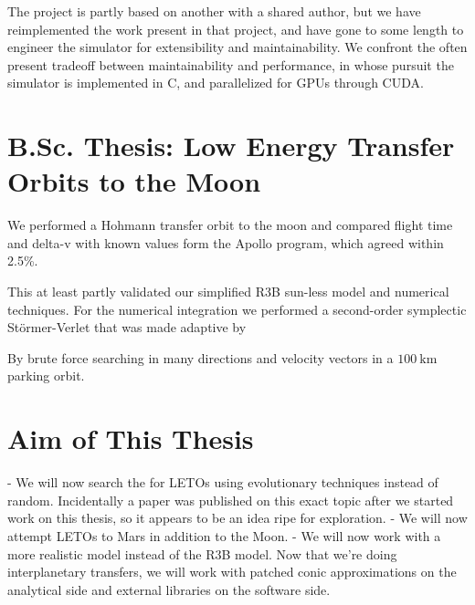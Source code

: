 The project is partly based on another with a shared author, but we have reimplemented the work present in that project, and have gone to some length to engineer the simulator for extensibility and maintainability. We confront the often present tradeoff between maintainability and performance, in whose pursuit the simulator is implemented in C, and parallelized for GPUs through CUDA. 

\section{B.Sc. Thesis: Low Energy Transfer Orbits to the Moon}


We performed a Hohmann transfer orbit to the moon and compared flight time and delta-v with known values form the Apollo program, which agreed within 2.5\%.


This at least partly validated our simplified R3B sun-less model and numerical techniques. For the numerical integration we performed a second-order symplectic Störmer-Verlet that was made adaptive by 


By brute force searching in many directions and velocity vectors in a \(\SI{100}{\km}\) parking orbit.

\section{Aim of This Thesis}


- We will now search the for LETOs using evolutionary techniques instead of random. Incidentally a paper \cite{Izzo2018} was published on this exact topic after we started work on this thesis, so it appears to be an idea ripe for exploration.
- We will now attempt LETOs to Mars in addition to the Moon.
- We will now work with a more realistic model instead of the R3B model. Now that we're doing interplanetary transfers, we will work with patched conic approximations on the analytical side and external libraries on the software side.
